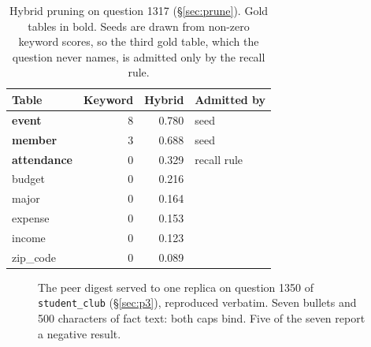 \documentclass[conference]{IEEEtran}
\begin{document}
\begin{table}[h]
\caption{Hybrid pruning on question 1317 (§\ref{sec:prune}). Gold tables in
bold. Seeds are drawn from non-zero keyword scores, so the third gold table,
which the question never names, is admitted only by the recall rule.}
\label{tab:appendix-prune-example}
\centering
\footnotesize
\begin{tabular}{@{}lrrl@{}}
\toprule
Table & Keyword & Hybrid & Admitted by \\
\midrule
\textbf{event}      & 8 & 0.780 & seed \\
\textbf{member}     & 3 & 0.688 & seed \\
\textbf{attendance} & 0 & 0.329 & recall rule \\
budget              & 0 & 0.216 & \\
major               & 0 & 0.164 & \\
expense             & 0 & 0.153 & \\
income              & 0 & 0.123 & \\
zip\_code           & 0 & 0.089 & \\
\bottomrule
\end{tabular}
\end{table}

\begin{figure}[h]
\centering
{}
\caption{The peer digest served to one replica on question 1350 of
\texttt{student\_club} (§\ref{sec:p3}), reproduced verbatim. Seven bullets and
500 characters of fact text: both caps bind. Five of the seven report a negative
result.}
\label{fig:appendix-digest}
\end{figure}
\end{document}
